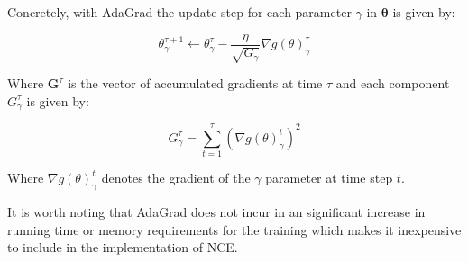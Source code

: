 Concretely, with AdaGrad the update step for each parameter $\gamma$ in $\boldsymbol{\theta}$ is given by:

\begin{equation}
\theta^{\tau + 1}_{\gamma} \leftarrow \theta^{\tau}_{\gamma} - \frac{\eta}{\sqrt{G_{\gamma}}} \nabla g(\theta)^{\tau}_{\gamma}
\end{equation}

Where $\mathbf{G}^{\tau}$ is the vector of accumulated gradients at time $\tau$ and each component $G^{\tau}_\gamma$ is given by:

\begin{equation}
G^{\tau}_{\gamma} = \sum_{t=1}^{\tau} \left(\nabla g(\theta)^{t}_{\gamma}\right)^{2}
\label{eq:adagrad-g}
\end{equation}

Where $\nabla g(\theta)^{t}_{\gamma}$ denotes the gradient of the $\gamma$ parameter at time step $t$.

It is worth noting that AdaGrad does not incur in an significant increase in running time or memory requirements for the training which makes it inexpensive to include in the implementation of NCE.
